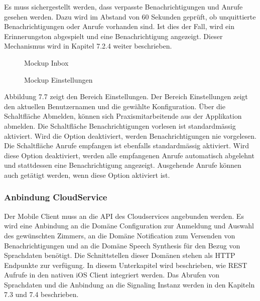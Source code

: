 Es muss sichergestellt werden, dass verpasste Benachrichtigungen und Anrufe gesehen werden.
Dazu wird im Abstand von 60 Sekunden geprüft, ob unquittierte Benachrichtigungen oder Anrufe vorhanden sind.
Ist dies der Fall, wird ein Erinnerungston abgespielt und eine Benachrichtigung angezeigt.
Dieser Mechanismus wird in Kapitel 7.2.4 weiter beschrieben.

\begin{figure}[h]
    \centering
    \begin{minipage}[b]{0.4\textwidth}
        \caption{Mockup Inbox}
    \end{minipage}
    \hfill
    \begin{minipage}[b]{0.4\textwidth}
        \caption{Mockup Einstellungen}
    \end{minipage}\label{fig:Mockups-Inbox-Settings}
\end{figure}

Abbildung 7.7 zeigt den Bereich Einstellungen.
Der Bereich Einstellungen zeigt den aktuellen Benutzernamen und die gewählte Konfiguration.
Über die Schaltfläche Abmelden, können sich Praxismitarbeitende aus der Applikation abmelden.
Die Schaltfläche Benachrichtigungen vorlesen ist standardmässig aktiviert.
Wird die Option deaktiviert, werden Benachrichtigungen nie vorgelesen.
Die Schaltfläche Anrufe empfangen ist ebenfalls standardmässig aktiviert.
Wird diese Option deaktiviert, werden alle empfangenen Anrufe automatisch abgelehnt und stattdessen eine Benachrichtigung angezeigt.
Ausgehende Anrufe können auch getätigt werden, wenn diese Option aktiviert ist.

\subsubsection{Anbindung CloudService}

Der Mobile Client muss an die API des Cloudservices angebunden werden.
Es wird eine Anbindung an die Domäne Configuration zur Anmeldung und Auswahl des gewünschten Zimmers, an die Domäne Notification zum Versenden von Benachrichtigungen und an die Domäne Speech Synthesis für den Bezug von Sprachdaten benötigt.
Die Schnittstellen dieser Domänen stehen als HTTP Endpunkte zur verfügung.
In diesem Unterkapitel wird beschrieben, wie REST Aufrufe in den nativen iOS Client integriert werden.
Das Abrufen von Sprachdaten und die Anbindung an die Signaling Instanz werden in den Kapiteln 7.3 und 7.4 beschrieben.

